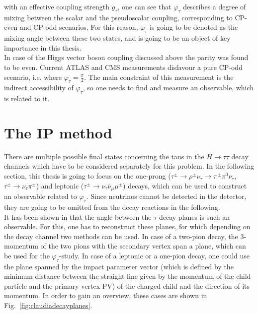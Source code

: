 with an effective coupling strength $g_\tau$, one can see that $\varphi_\tau$ describes a degree of mixing between the scalar and the pseudoscalar coupling, corresponding to CP-even and CP-odd scenarios. For this reason, $\varphi_\tau$ is going to be denoted as the mixing angle between these two states, and is going to be an object of key importance in this thesis.\\
In case of the Higgs vector boson coupling discussed above the parity was found to be even. Current ATLAS and CMS measurements \parencite{CMS_CP_odd_exclusion,ATLAS_CP_odd_exclusion} disfavour a pure CP-odd scenario, i.e. where $\varphi_\tau = \frac{\pi}{2}$. The main constraint of this measurement is the indirect accessibility of $\varphi_\tau$, so one needs to find and measure an observable, which is related to it.
\section{The IP method}
\label{sec:IP_method}
There are multiple possible final states concerning the taus in the $H\rightarrow\tau\tau$ decay channels which have to be considered separately for this problem. In the following section, this thesis is going to focus on the one-prong ($\tau^\pm \rightarrow \rho^\pm \nu_\tau \rightarrow \pi^\pm\pi^0\nu_\tau$, $\tau^\pm \rightarrow \nu_\tau\pi^\pm$) and leptonic ($\tau^\pm \rightarrow \nu_\tau\overline{\nu}_\mu \mu^\pm$) decays, which can be used to construct an observable related to $\varphi_\tau$. Since neutrinos cannot be detected in the detector, they are going to be omitted from the decay reactions in the following.\\
It has been shown in \parencite{Berge_1prong, Berge_CP_Prospects} that the angle between the $\tau$ decay planes is such an observable. For this, one has to reconstruct these planes, for which depending on the decay channel two methods can be used. In case of a two-pion decay, the 3-momentum of the two pions with the secondary vertex span a plane, which can be used for the $\varphi_\tau$-study. In case of a leptonic or a one-pion decay, one could use the plane spanned by the impact parameter vector (which is defined by the minimum distance between the straight line given by the momentum of the child particle and the primary vertex PV) of the charged child and the direction of its momentum. In order to gain an overview, these cases are shown in Fig.~\ref{fig:claudiadecayplanes}.
